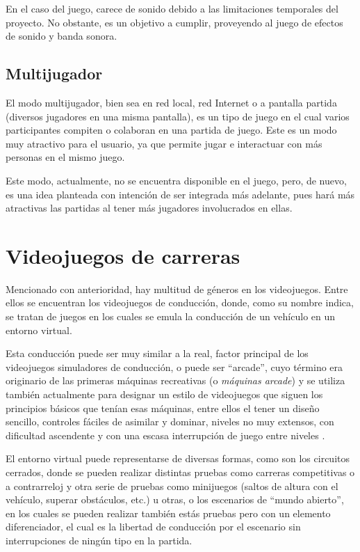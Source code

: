 En el caso del juego, carece de sonido debido a las limitaciones temporales del proyecto. No obstante, es un objetivo a cumplir, proveyendo al juego de efectos de sonido y banda sonora.

\subsection{Multijugador}

El modo multijugador, bien sea en red local, red Internet o a pantalla partida (diversos jugadores en una misma pantalla), es un tipo de juego en el cual varios participantes compiten o colaboran en una partida de juego. Este es un modo muy atractivo para el usuario, ya que permite jugar e interactuar con más personas en el mismo juego.

Este modo, actualmente, no se encuentra disponible en el juego, pero, de nuevo, es una idea planteada con intención de ser integrada más adelante, pues hará más atractivas las partidas al tener más jugadores involucrados en ellas.

\section{Videojuegos de carreras} 

Mencionado con anterioridad, hay multitud de géneros en los videojuegos. Entre ellos se encuentran los videojuegos de conducción, donde, como su nombre indica, se tratan de juegos en los cuales se emula la conducción de un vehículo en un entorno virtual. 

Esta conducción puede ser muy similar a la real, factor principal de los videojuegos simuladores de conducción, o puede ser ``arcade'', cuyo término era originario de las primeras máquinas recreativas (o \textit{máquinas arcade}) y se utiliza también actualmente para designar un estilo de videojuegos que siguen los principios básicos que tenían esas máquinas, entre ellos el tener un diseño sencillo, controles fáciles de asimilar y dominar, niveles no muy extensos, con dificultad ascendente y con una escasa interrupción de juego entre niveles \cite{wikij:arcade}.

El entorno virtual puede representarse de diversas formas, como son los circuitos cerrados, donde se pueden realizar distintas pruebas como carreras competitivas o a contrarreloj y otra serie de pruebas como minijuegos (saltos de altura con el vehículo, superar obstáculos, etc.) u otras, o los escenarios de ``mundo abierto'', en los cuales se pueden realizar también estás pruebas pero con un elemento diferenciador, el cual es la libertad de conducción por el escenario sin interrupciones de ningún tipo en la partida.


